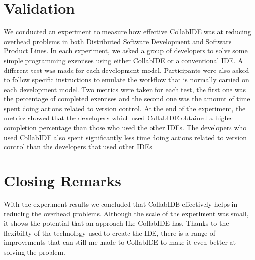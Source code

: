 \documentclass[10pt, conference]{IEEEtran}
\begin{document}
\section{Validation}
\label{sec:validation}

We conducted an experiment to measure how effective CollabIDE was at reducing overhead problems 
in both Distributed Software Development and Software Product Lines. In each experiment, we asked 
a group of developers to solve some simple programming exercises using either CollabIDE or a 
conventional IDE. A different test was made for each development model. Participants were also 
asked to follow specific instructions to emulate the workflow that is normally carried on each 
development model. Two metrics were taken for each test, the first one was the percentage of 
completed exercises and the second one was the amount of time spent doing actions related to 
version control.
At the end of the experiment, the metrics showed that the developers which used CollabIDE obtained 
a higher completion percentage than those who used the other IDEs. The developers who used 
CollabIDE also spent significantly less time doing actions related to version control than the 
developers that used other IDEs.

\section{Closing Remarks}
\label{sec:conclusion}


With the experiment results we concluded that CollabIDE effectively helps in reducing the overhead 
problems. Although the scale of the experiment was small, it shows the potential that an approach like 
CollabIDE has. Thanks to the flexibility of the technology used to create the IDE, there is a range of 
improvements that can still me made to CollabIDE to make it even better at solving the problem.  


%


  
\end{document}
